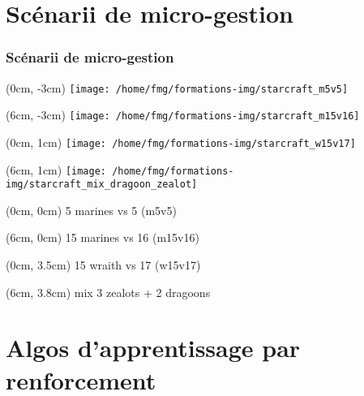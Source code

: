 \documentclass[smaller]{beamer}
\begin{document}

\section{Scénarii de micro-gestion}

\begin{frame}
  \frametitle{Scénarii de micro-gestion}

  \begin{textblock*}{5cm}(0cm, -3cm)
    \texttt{[image: /home/fmg/formations-img/starcraft\_m5v5]}
  \end{textblock*}

  \begin{textblock*}{5cm}(6cm, -3cm)
    \texttt{[image: /home/fmg/formations-img/starcraft\_m15v16]}
  \end{textblock*}

  \begin{textblock*}{5cm}(0cm, 1cm)
    \texttt{[image: /home/fmg/formations-img/starcraft\_w15v17]}
  \end{textblock*}

  \begin{textblock*}{5cm}(6cm, 1cm)
    \texttt{[image: /home/fmg/formations-img/starcraft\_mix\_dragoon\_zealot]}
  \end{textblock*}

  \begin{textblock*}{5cm}(0cm, 0cm)
    5 marines vs 5 (m5v5)
  \end{textblock*}

  \begin{textblock*}{5cm}(6cm, 0cm)
    15 marines vs 16 (m15v16)
  \end{textblock*}

  \begin{textblock*}{5cm}(0cm, 3.5cm)
    15 wraith vs 17 (w15v17)
  \end{textblock*}

  \begin{textblock*}{5cm}(6cm, 3.8cm)
    mix 3 zealots + 2 dragoons
  \end{textblock*}

\end{frame}


\section{Algos d'apprentissage par renforcement}
\end{document}
